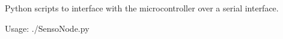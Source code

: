 Python scripts to interface with the microcontroller over a serial interface.

Usage\+: ./\+Senso\+Node.py 